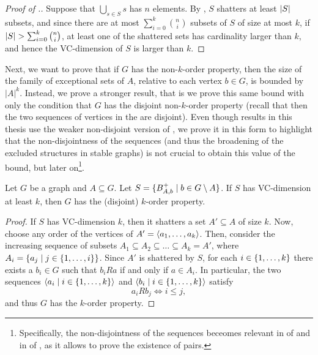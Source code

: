         \begin{proof}[Proof of .]
            Suppose that $\bigcup_{s \in S} s$ has $n$ elements.
            By , $S$ shatters at least $| S |$ subsets, and since there are at most
            $\sum_{i=0}^k \binom{n}{i}$ subsets of $S$ of size at most $k$, if
            $| S | > \sum_{i=0}^k \binom{n}{i}$, at least one of the shattered sets has cardinality larger than $k$,
            and hence the VC-dimension of $S$ is larger than $k$.
        \end{proof}

        Next, we want to prove that if $G$ has the non-$k$-order property, then the size of the family of exceptional
        sets of $A$, relative to each vertex $b \in G$, is bounded by $|A|^k$.
        Instead, we prove a stronger result, that is we prove this same bound with only the condition that $G$
        has the disjoint non-$k$-order property (recall that then the two sequences of vertices in the
         are disjoint).
        Even though results in this thesis use the weaker non-disjoint version of ,
        we prove it in this form to highlight that the non-disjointness of the sequences (and thus the broadening of
        the excluded structures in stable graphs) is not crucial to obtain this value of the bound, but later on\footnote{
            Specifically, the non-disjointness of the sequences beceomes relevant in  of
             and in  of , as it allows
            to prove the existence of \regular pairs.
        }.

        \begin{lemma} \label{lem:vc_dimension_implies_k_order_property}
            Let $G$ be a graph and $A \subseteq G$.
            Let $S = \{ B^+_{A,b} \mid b \in G \setminus A \}$.
            If $S$ has VC-dimension at least $k$, then $G$ has the (disjoint) $k$-order property.
            \begin{proof}
                If $S$ has VC-dimension $k$, then it shatters a set $A' \subseteq A$ of size $k$.
                Now, choose any order of the vertices of $A' = \left< a_1, \dots, a_k \right>$.
                Then, consider the increasing sequence of subsets $A_1 \subseteq A_2 \subseteq \dots \subseteq A_k = A'$,
                where $A_i = \{ a_j \mid j \in \{ 1, \dots, i \} \}$.
                Since $A'$ is shattered by $S$, for each $i \in \{ 1, \dots, k \}$ there exists a $b_i \in G$ such that
                $b_i R a$ if and only if $a \in A_i$.
                In particular, the two sequences $\left< a_i \mid i \in \{ 1, \dots, k \} \right>$ and
                $\left< b_i \mid i \in \{ 1, \dots, k \} \right>$ satisfy
                \[
                    a_i R b_j \Leftrightarrow i \leq j,
                \]
                and thus $G$ has the $k$-order property.
            \end{proof}
        \end{lemma}

